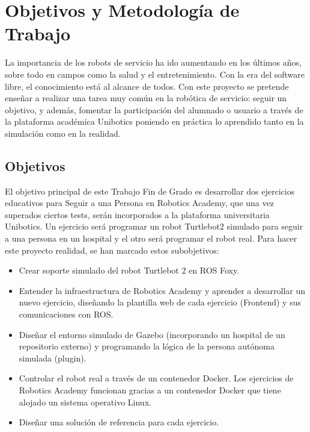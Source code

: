 \chapter{Objetivos y Metodología de Trabajo}
\label{cap:capitulo2}

La importancia de los robots de servicio ha ido aumentando en los últimos años, sobre todo en campos como la salud y el entretenimiento. Con la era del software libre, el conocimiento está al alcance de todos. Con este proyecto se pretende enseñar a realizar una tarea muy común en la robótica de servicio: seguir un objetivo, y además, fomentar la participación del alumnado o usuario a través de la plataforma académica Unibotics poniendo en práctica lo aprendido tanto en la simulación como en la realidad.




\section{Objetivos}
\label{sec:objetivos}
El objetivo principal de este Trabajo Fin de Grado es desarrollar dos ejercicios educativos para Seguir a una Persona en Robotics Academy, que una vez superados ciertos tests, serán incorporados a la plataforma universitaria Unibotics. Un ejercicio será programar un robot Turtlebot2 simulado para seguir a una persona en un hospital y el otro será programar el robot real. Para hacer este proyecto realidad, se han marcado estos subobjetivos:

\begin{itemize}
	\item Crear soporte simulado del robot Turtlebot 2 en ROS Foxy.
	\item Entender la infraestructura de Robotics Academy y aprender a desarrollar un nuevo ejercicio, diseñando la plantilla web de cada ejercicio (Frontend) y sus comunicaciones con ROS.
	\item Diseñar el entorno simulado de Gazebo (incorporando un hospital de un repositorio externo) y programando la lógica de la persona autónoma simulada (plugin).
	\item Controlar el robot real a través de un contenedor Docker. Los ejercicios de Robotics Academy funcionan gracias a un contenedor Docker que tiene alojado un sistema operativo Linux.
	\item Diseñar una solución de referencia para cada ejercicio.
\end{itemize}



